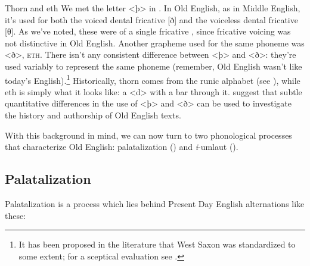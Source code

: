 \begin{sourcebox}{Thorn and eth}
We met the letter  <þ> in . In Old English, as in Middle English, it's used for both the voiced dental fricative [ð] and the voiceless dental fricative [θ]. As we've noted, these were  of a single fricative , since fricative voicing was not distinctive in Old English. Another grapheme used for the same phoneme was <ð>, \textsc{eth}. There isn't any consistent difference between <þ> and <ð>: they're used variably to represent the same phoneme (remember, Old English wasn't  like today's English).\footnote{It has been proposed in the literature that West Saxon was standardized to some extent; for a sceptical evaluation see \citet{Hogg2006}.} Historically, thorn comes from the runic alphabet (see ), while eth is simply what it looks like: a  <d> with a bar through it. \citet{DroutChauvet2015} suggest that subtle quantitative differences in the use of <þ> and <ð> can be used to investigate the history and authorship of Old English texts.
\end{sourcebox}


\noindent With this background in mind, we can now turn to two phonological processes that characterize Old English: palatalization () and \emph{i}-umlaut ().

\subsection{Palatalization}\label{OE-palatalization}
Palatalization is a process which lies behind Present Day English alternations like these:

